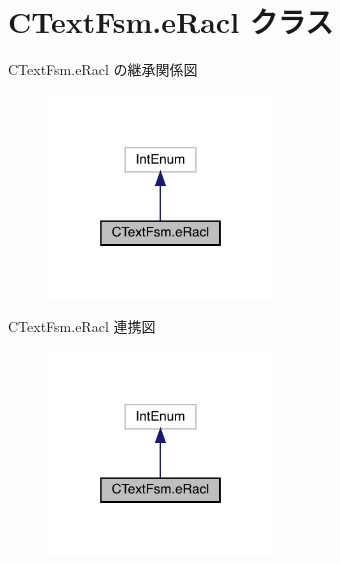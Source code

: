 \hypertarget{classCTextFsm_1_1eRacl}{}\section{C\+Text\+Fsm.\+e\+Racl クラス}
\label{classCTextFsm_1_1eRacl}


C\+Text\+Fsm.\+e\+Racl の継承関係図
\nopagebreak
\begin{figure}[H]
\begin{center}
\leavevmode
\includegraphics[width=169pt]{classCTextFsm_1_1eRacl__inherit__graph}
\end{center}
\end{figure}


C\+Text\+Fsm.\+e\+Racl 連携図
\nopagebreak
\begin{figure}[H]
\begin{center}
\leavevmode
\includegraphics[width=169pt]{classCTextFsm_1_1eRacl__coll__graph}
\end{center}
\end{figure}

